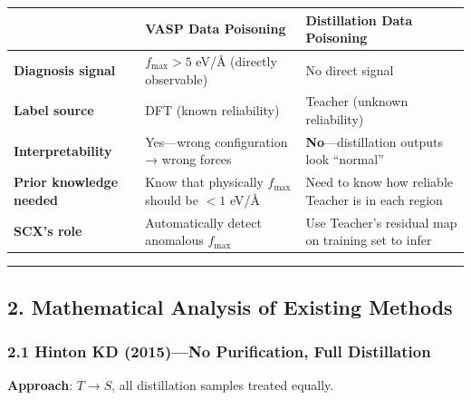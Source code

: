 \documentclass[
  12pt,
]{article}
\begin{document}
\begin{longtable}[]{@{}
  >{\raggedright\arraybackslash}p{}
  >{\raggedright\arraybackslash}p{}
  >{\raggedright\arraybackslash}p{}@{}}
\toprule\noalign{}
\begin{minipage}[b]{\linewidth}\raggedright
\end{minipage} & \begin{minipage}[b]{\linewidth}\raggedright
VASP Data Poisoning
\end{minipage} & \begin{minipage}[b]{\linewidth}\raggedright
Distillation Data Poisoning
\end{minipage} \\
\midrule\noalign{}
\endhead
\bottomrule\noalign{}
\endlastfoot
\textbf{Diagnosis signal} & $f_{\max} > 5$ eV/Å (directly observable) & No direct signal \\
\textbf{Label source} & DFT (known reliability) & Teacher (unknown reliability) \\
\textbf{Interpretability} & Yes---wrong configuration → wrong forces & \textbf{No}---distillation outputs look ``normal'' \\
\textbf{Prior knowledge needed} & Know that physically $f_{\max}$ should be $< 1$ eV/Å & Need to know how reliable Teacher is in each region \\
\textbf{SCX's role} & Automatically detect anomalous $f_{\max}$ & Use Teacher's residual map on training set to infer \\
\end{longtable}

\begin{center}\rule{0.5\linewidth}{0.5pt}\end{center}

\subsection{2. Mathematical Analysis of Existing Methods}\label{mathematical-analysis-of-existing-methods}

\subsubsection{2.1 Hinton KD (2015)---No Purification, Full Distillation}\label{hinton-kd-2015-no-purification}

\textbf{Approach}: $T \to S$, all distillation samples treated equally.
\end{document}
